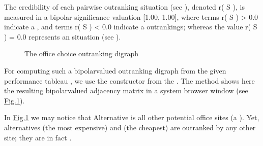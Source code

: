 \documentclass[a4paper,12pt,english]{sphinxhowto}
\let\sphinxpxdimen\pdfpxdimen\else\newdimen\sphinxpxdimen
\begin{document}
The credibility of each pairwise outranking situation (see ), denoted r( S ), is measured in a bipolar significance valuation {[}\sphinxhyphen{}1.00, 1.00{]}, where  terms r( S ) \textgreater{} 0.0 indicate a , and  terms r( S ) \textless{} 0.0 indicate a  outrankings; whereas the  value r( S ) = 0.0 represents an  situation (see ).

\begin{figure}[H]
\centering
\capstart

\noindent\sphinxincludegraphics[width=400\sphinxpxdimen]{{officeChoiceOutranking}.png}
\caption{The office choice outranking digraph}\label{\detokenize{tutorial:officechoiceoutranking}}\end{figure}

For computing such a bipolar\sphinxhyphen{}valued outranking digraph from the given performance tableau , we use the  constructor from the . The  method shows here the resulting bipolar\sphinxhyphen{}valued adjacency matrix in a system browser window (see \hyperref[\detokenize{tutorial:officechoiceoutranking}]{Fig.\@ \ref{\detokenize{tutorial:officechoiceoutranking}}}).

\begin{sphinxVerbatim}[commandchars=\\\{\},numbers=left,firstnumber=1,stepnumber=1]
   
  
\end{sphinxVerbatim}

In \hyperref[\detokenize{tutorial:officechoiceoutranking}]{Fig.\@ \ref{\detokenize{tutorial:officechoiceoutranking}}} we may notice that Alternative  is  all other potential office sites (a ). Yet, alternatives  (the most expensive) and  (the cheapest) are  outranked by any other site; they are in fact  .
\end{document}
